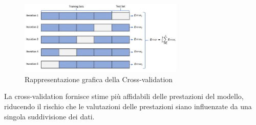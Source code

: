 \begin{figure}[!ht]
    \centering
    \includegraphics[width=0.7\textwidth]{Immagini/cross_validation.png}
    \caption{Rappresentazione grafica della Cross-validation}
    \label{fig:cross_validation}
\end{figure}

La cross-validation fornisce stime più affidabili delle prestazioni del modello, riducendo il
rischio che le valutazioni delle prestazioni siano influenzate da una singola suddivisione dei dati.
